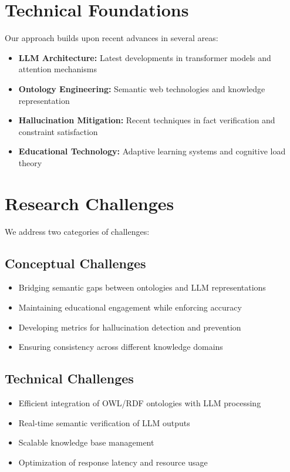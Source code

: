 \section{Technical Foundations}

Our approach builds upon recent advances in several areas:

\begin{itemize}
    \item \textbf{LLM Architecture:} Latest developments in transformer models and attention mechanisms \cite{zhang2024survey}
    \item \textbf{Ontology Engineering:} Semantic web technologies and knowledge representation \cite{funk2023neuro}
    \item \textbf{Hallucination Mitigation:} Recent techniques in fact verification and constraint satisfaction \cite{ji2023survey}
    \item \textbf{Educational Technology:} Adaptive learning systems and cognitive load theory
\end{itemize}

\section{Research Challenges}

We address two categories of challenges:

\subsection{Conceptual Challenges}
\begin{itemize}
    \item Bridging semantic gaps between ontologies and LLM representations
    \item Maintaining educational engagement while enforcing accuracy
    \item Developing metrics for hallucination detection and prevention
    \item Ensuring consistency across different knowledge domains
\end{itemize}

\subsection{Technical Challenges}
\begin{itemize}
    \item Efficient integration of OWL/RDF ontologies with LLM processing
    \item Real-time semantic verification of LLM outputs
    \item Scalable knowledge base management
    \item Optimization of response latency and resource usage
\end{itemize}

